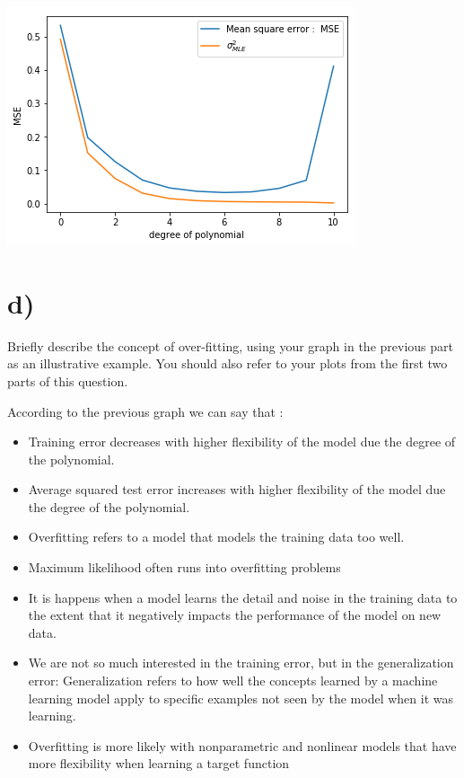 \documentclass[12pt,twoside]{article}
\begin{document}
\begin{center}
	\includegraphics{../index2}	     
\end{center}

\section*{d)} Briefly describe the concept of over-fitting, using your graph in the previous part as an illustrative example. You should also refer to your plots from the first two parts of this question.

According to the previous graph we can say that :
\begin{itemize}
	\item Training error decreases with higher flexibility of the model due the degree of the polynomial.
	\item Average squared test error increases with higher flexibility of the model due the degree of the polynomial. 
	\item Overfitting refers to a model that models the training data too well.
	\item Maximum likelihood often runs into overfitting problems
	\item It is happens when a model learns the detail and noise in the training data to the extent that it negatively impacts the performance of the model on new data.
	\item We are not so much interested in the training error, but in the
	generalization error: Generalization refers to how well the concepts learned by a machine learning model apply to specific examples not seen by the model when it was learning.
	\item Overfitting is more likely with nonparametric and nonlinear models that have more flexibility when learning a target function 
\end{itemize}
\end{document}
